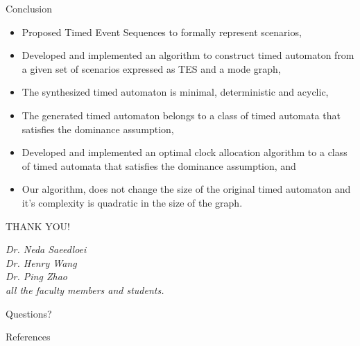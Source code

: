 \documentclass[10pt]{beamer}
\theoremstyle{plain}
\theoremstyle{definition}
\begin{document}
\begin{frame}{Conclusion}
	\begin{itemize}
		\item Proposed Timed Event Sequences to formally represent scenarios,
		\item Developed and implemented an algorithm to construct timed automaton  from a given set of scenarios expressed as TES and a mode graph,
		\item The synthesized timed automaton is minimal, deterministic and acyclic,
		\item The generated timed automaton belongs to a class of timed automata that satisfies the dominance assumption,
		\item Developed and implemented an optimal clock allocation algorithm to a class of timed automata that satisfies the dominance assumption, and
		\item Our algorithm, does not change the size of the original timed automaton and it's complexity is quadratic in the size of the graph.
	\end{itemize}
\end{frame}

\begin{frame}[standout]
\Huge THANK YOU! \\
\vspace{0.5cm}
\small

\emph{Dr. Neda Saeedloei}\\
\emph{Dr. Henry Wang}\\
\emph{Dr. Ping Zhao}\\
\emph{all the faculty members and students.}
\end{frame}

\begin{frame}[standout]
	Questions?
\end{frame}


\begin{frame}[allowframebreaks]{References}
	
	
\end{frame}
\end{document}
